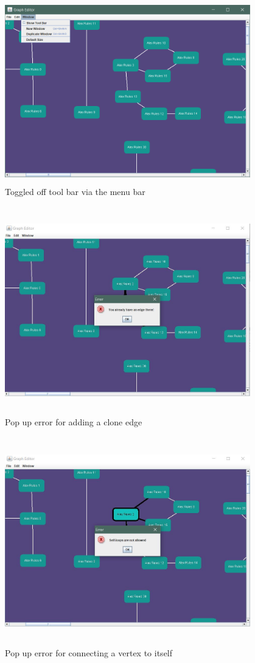 \documentclass[a4paper]{article}
\begin{document}
\begin{figure}[h!]
            \centering
            \includegraphics[height=8cm,width=0.95\textwidth]{im/toggled.png}
            \caption{Toggled off tool bar via the menu bar}
            \label{fig: tog}
\end{figure}
\begin{figure}[h!]
            \centering
            \includegraphics[height=9cm,width=0.95\textwidth]{im/popUpEdge.JPG}
            \caption{Pop up error for adding a clone edge}
            \label{fig: edgePopUp}
\end{figure}
\begin{figure}[h!]
            \centering
            \includegraphics[height=9cm,width=0.95\textwidth]{im/popUpSelfLoop.JPG}
            \caption{Pop up error for connecting a vertex to itself}
            \label{fig: edgeSelfLoop}
\end{figure}
\end{document}
